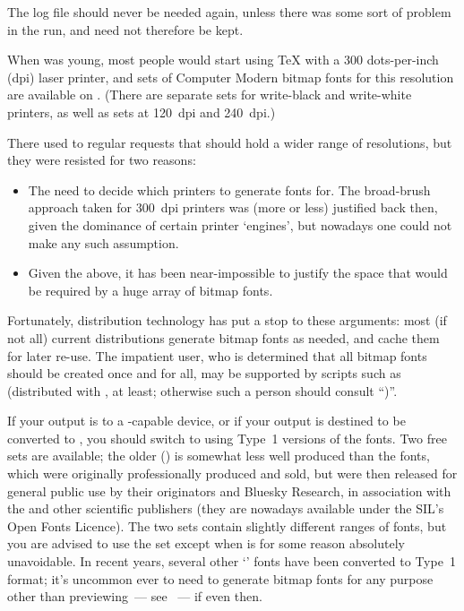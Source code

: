 The log file should never be needed again, unless there was some sort
of problem in the \MF{} run, and need not therefore be kept.


When  was young, most people would start using \TeX{}
with a 300 dots-per-inch (dpi) laser printer, and sets of Computer
Modern bitmap fonts for this resolution are available on .
(There are separate sets for write-black and write-white printers, as
well as sets at 120~dpi and 240~dpi.)

There used to regular requests that  should hold
a wider range of resolutions, but they were resisted for two reasons:
\begin{itemize}
\item The need to decide which printers to generate fonts for.  The
  broad-brush approach taken for 300~dpi printers was (more or less)
  justified back then, given the dominance of certain printer
  `engines', but nowadays one could not make any such assumption.
\item Given the above, it has been near-impossible to justify the
  space that would be required by a huge array of bitmap fonts.
\end{itemize}
Fortunately, \AllTeX{} distribution technology has put a stop to these
arguments: most (if not all) current distributions generate bitmap
fonts as needed, and cache them for later re-use.  The impatient
user, who is determined that all bitmap fonts should be created once
and for all, may be supported by scripts such as 
(distributed with \texlive{}, at least; otherwise such a
person should consult ``)''.

If your output is to a \PS{}-capable device, or if your output is
destined to be converted to , you should switch to
using Type~1 versions of the  fonts.  Two free
sets are available; the older () is
somewhat less well produced than the  fonts, which were
originally professionally produced and sold, but were then released
for general public use by their originators \YandY{} and Bluesky Research,
in association with the  and other scientific publishers
(they are nowadays available under the SIL's Open Fonts Licence).  The
two sets contain slightly different ranges of fonts, but you are
advised to use the  set except when 
is for some reason absolutely unavoidable.  In recent years, several
other `\MF{}' fonts have been converted to Type~1 format; it's
uncommon ever to need to generate bitmap fonts for any purpose other
than previewing~--- see %
~---
if even then.

